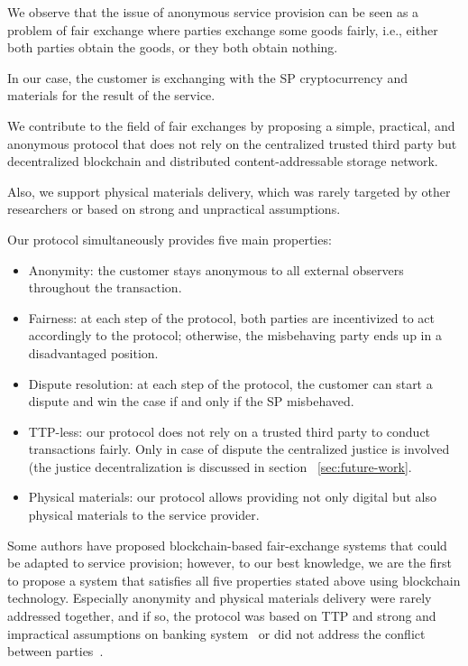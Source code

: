 \documentclass{ieeeaccess}
\begin{document}
We observe that the issue of anonymous service provision can be seen as a problem of fair exchange where parties exchange some goods fairly, i.e., either both parties obtain the goods, or they both obtain nothing.

In our case, the customer is exchanging with the SP cryptocurrency and materials for the result of the service.

We contribute to the field of fair exchanges by proposing a simple, practical, and anonymous protocol that does not rely on the centralized trusted third party but decentralized blockchain and
distributed content-addressable storage network.

Also, we support physical materials delivery, which was rarely targeted by other researchers or based on strong and unpractical assumptions.

Our protocol simultaneously provides five main properties:

\begin{itemize}
\item Anonymity: the customer stays anonymous to all external observers throughout the transaction.
\item Fairness:
at each step of the protocol, both parties are incentivized to act accordingly to the protocol; otherwise, the misbehaving party ends up in a disadvantaged position.
\item Dispute resolution: at each step of the protocol, the customer can start a dispute and win the case if and only if the SP misbehaved.

\item TTP-less: 
our protocol does not rely on a trusted third party to conduct transactions fairly. Only in case of dispute the centralized justice is involved (the justice decentralization is discussed in section ~\ref{sec:future-work}.
\item Physical materials: our protocol allows providing not only digital but also physical materials to the service provider.
\end{itemize} 

Some authors have proposed blockchain-based fair-exchange systems that could be adapted to service provision; however, to our best knowledge, we are the first to propose a system that satisfies all five properties stated above using blockchain technology. Especially anonymity and physical materials delivery were rarely addressed together, and if so, the protocol was based on TTP and strong and impractical assumptions on banking system~\cite{birjoveanuAnonymityFairexchangeEcommerce2015} or did not address the conflict
between parties~\cite{altawyLelantosBlockchainBasedAnonymous2017}.
\end{document}
